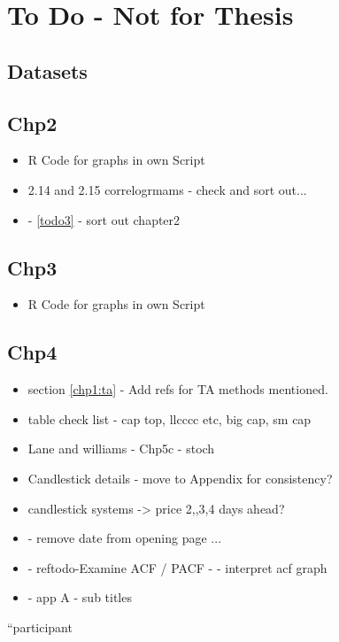 
\chapter{To Do - Not for Thesis} %

\label{Chapter7} %



\section{Datasets}

\section{Chp2}
\begin{itemize}
\item R Code for graphs in own Script
\item 2.14 and 2.15 correlogrmams - check and sort out...
\item - \ref{todo3} - sort out chapter2
\end{itemize}

\section{Chp3}
\begin{itemize}
\item R Code for graphs in own Script

\end{itemize}

\section{Chp4}
\begin{itemize}
\item section \ref{chp1:ta} - Add refs for TA methods mentioned.
\item table check list - cap top, llcccc etc, big cap, sm cap
\item Lane \cite{lane1986using} and williams \cite{williams2011long} \cite{williams1989definitive} - Chp5c - stoch
\item Candlestick details - move to Appendix for consistency?
\item candlestick systems -> price 2,,3,4 days ahead?
\item - remove date from opening page ...

\item - ref{todo-Examine ACF / PACF} - - interpret acf graph
\item - app A - sub titles
\end{itemize}


\textquotedblleft participant